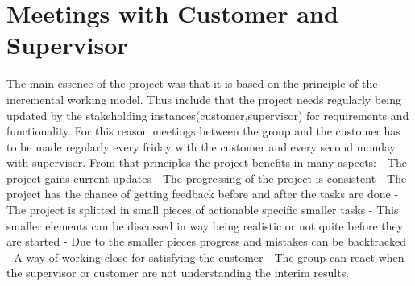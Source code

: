 \section{Meetings with Customer and Supervisor}
The main essence of the project was that it is based on the principle of the incremental working model. Thus include that the project needs regularly being updated by the stakeholding instances(customer,supervisor) for requirements and functionality. For this reason meetings between the group and the customer has to be made regularly every friday with the customer and every second monday with supervisor.   From that principles the project benefits in many aspects: - The project gains current updates - The progressing of the project is consistent - The project has the chance of getting feedback before and after the tasks are done - The project is splitted in small pieces of actionable specific smaller tasks - This smaller elements can be discussed in way being realistic or not quite before they are started - Due to the smaller pieces progress and mistakes can be backtracked - A way of working close for satisfying the customer - The group can react when the supervisor or customer are not understanding the interim results.

